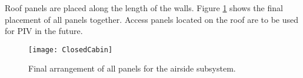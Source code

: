 \FloatBarrier

Roof panels are placed along the length of the walls. Figure \ref{fig:ClosedCabin} shows the final placement of all panels together. Access panels located on the roof are to be used for PIV in the future. 

\begin{figure} [h!]
\centering
\texttt{[image: ClosedCabin]}
\caption{Final arrangement of all panels for the airside subsystem.}
\label{fig:ClosedCabin}
\end{figure}
